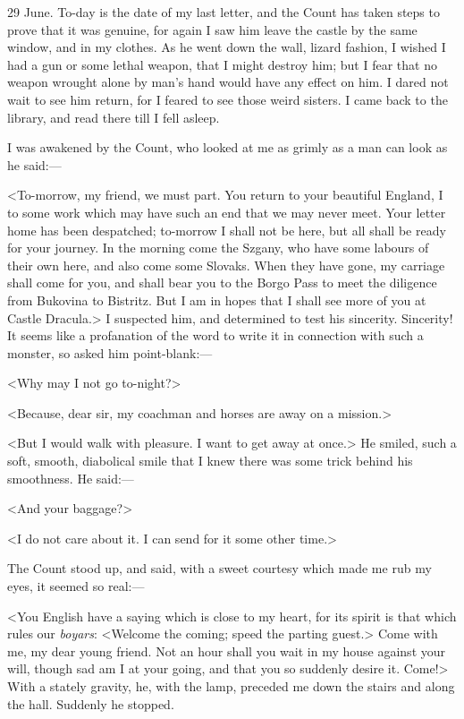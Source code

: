 \begin{diary}{29 June.}
To-day is the date of my last letter, and the Count has taken steps to prove that it was genuine, for again I saw him leave the castle by the same window, and in my clothes. As he went down the wall, lizard fashion, I wished I had a gun or some lethal weapon, that I might destroy him; but I fear that no weapon wrought alone by man's hand would have any effect on him. I dared not wait to see him return, for I feared to see those weird sisters. I came back to the library, and read there till I fell asleep.

I was awakened by the Count, who looked at me as grimly as a man can look as he said:—

<To-morrow, my friend, we must part. You return to your beautiful England, I to some work which may have such an end that we may never meet. Your letter home has been despatched; to-morrow I shall not be here, but all shall be ready for your journey. In the morning come the Szgany, who have some labours of their own here, and also come some Slovaks. When they have gone, my carriage shall come for you, and shall bear you to the Borgo Pass to meet the diligence from Bukovina to Bistritz. But I am in hopes that I shall see more of you at Castle Dracula.> I suspected him, and determined to test his sincerity. Sincerity! It seems like a profanation of the word to write it in connection with such a monster, so asked him point-blank:—

<Why may I not go to-night?>

<Because, dear sir, my coachman and horses are away on a mission.>

<But I would walk with pleasure. I want to get away at once.> He smiled, such a soft, smooth, diabolical smile that I knew there was some trick behind his smoothness. He said:—

<And your baggage?>

<I do not care about it. I can send for it some other time.>

The Count stood up, and said, with a sweet courtesy which made me rub my eyes, it seemed so real:—

<You English have a saying which is close to my heart, for its spirit is that which rules our \textit{boyars}: <Welcome the coming; speed the parting guest.> Come with me, my dear young friend. Not an hour shall you wait in my house against your will, though sad am I at your going, and that you so suddenly desire it. Come!> With a stately gravity, he, with the lamp, preceded me down the stairs and along the hall. Suddenly he stopped.


\end{diary}
